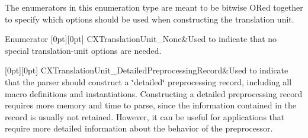The enumerators in this enumeration type are meant to be bitwise O\+Red together to specify which options should be used when constructing the translation unit. \begin{DoxyEnumFields}{Enumerator}
[0pt][0pt]{}\mbox{\label{group__CINDEX__TRANSLATION__UNIT_ggab1e4965c1ebe8e41d71e90203a723fe9afdea7f108d517d6e212d762e41a48480}} 
C\+X\+Translation\+Unit\+\_\+\+None&Used to indicate that no special translation-\/unit options are needed. \\
\hline

[0pt][0pt]{}\mbox{\label{group__CINDEX__TRANSLATION__UNIT_ggab1e4965c1ebe8e41d71e90203a723fe9a9e1dd69c4a2ff7954dca8df41a63c0e6}} 
C\+X\+Translation\+Unit\+\_\+\+Detailed\+Preprocessing\+Record&Used to indicate that the parser should construct a \char`\"{}detailed\char`\"{} preprocessing record, including all macro definitions and instantiations. Constructing a detailed preprocessing record requires more memory and time to parse, since the information contained in the record is usually not retained. However, it can be useful for applications that require more detailed information about the behavior of the preprocessor. \\
\hline


\end{DoxyEnumFields}
